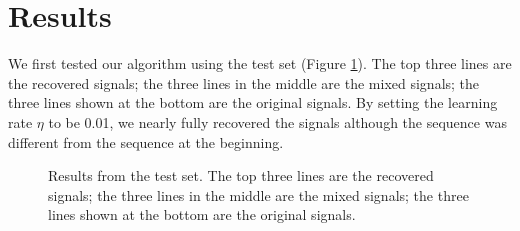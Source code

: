 \documentclass[UTF8,12pt]{article}
\begin{document}
	\section{Results}
	We first tested our algorithm using the test set (Figure \ref{fig:test}). The top three lines are the recovered signals; the three lines in the middle are the mixed signals; the three lines shown at the bottom are the original signals. By setting the learning rate $\eta$ to be 0.01, we nearly fully recovered the signals although the sequence was different from the sequence at the beginning.
	\begin{figure}[!ht]
	\centering
	\caption{\label{fig:test}Results from the test set. The top three lines are the recovered signals; the three lines in the middle are the mixed signals; the three lines shown at the bottom are the original signals.}
	\end{figure}	
\end{document}
